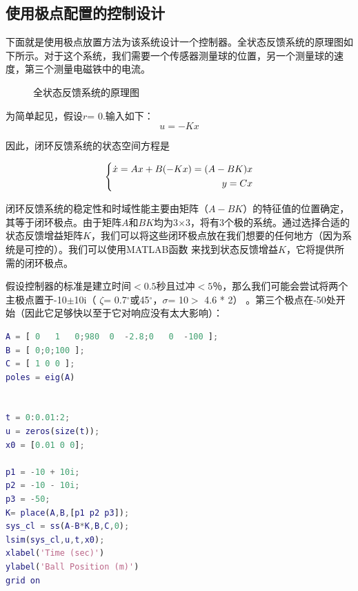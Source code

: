\documentclass[UTF8]{ctexart}
\begin{document}
\subsection{ 使用极点配置的控制设计}
\par   下面就是使用极点放置方法为该系统设计一个控制器。全状态反馈系统的原理图如下所示。对于这个系统，我们需要一个传感器测量球的位置，另一个测量球的速度，第三个测量电磁铁中的电流。
\newpage
\par \begin{figure}[ht]   
  \caption{\label{1} 全状态反馈系统的原理图}      
 \end{figure}
\par    为简单起见，假设$ r $= 0.输入如下：
\begin{equation}
u=-Kx
\end{equation}
\par 因此，闭环反馈系统的状态空间方程是
\par \begin{equation}
   \left  \{\begin{aligned}
      \dot x=Ax+B(-Kx)=(A-BK)x    \\
      y=Cx    \\
        \end{aligned}\\
    \right.
 \end{equation}
\par  闭环反馈系统的稳定性和时域性能主要由矩阵（$ A-BK $）的特征值的位置确定，其等于闭环极点。由于矩阵$ A $和$ BK $均为3×3，将有3个极的系统。通过选择合适的状态反馈增益矩阵$ K $，我们可以将这些闭环极点放在我们想要的任何地方（因为系统是可控的）。我们可以使用MATLAB函数 来找到状态反馈增益$ K $，它将提供所需的闭环极点。
\par  假设控制器的标准是建立时间$<0.5$秒且过冲$<5％$，那么我们可能会尝试将两个主极点置于-10$\pm$10i（ $\zeta$= 0.7$^{\circ}$或45$^{\circ}$，$ \sigma$= 10$>$ 4.6 * 2） 。第三个极点在-50处开始（因此它足够快以至于它对响应没有太大影响）：
\par  \begin{lstlisting}[language=matlab,escapeinside=``]
A = [ 0   1   0;980  0  -2.8;0   0  -100 ];
B = [ 0;0;100 ];
C = [ 1 0 0 ];
poles = eig(A)


t = 0:0.01:2;
u = zeros(size(t));
x0 = [0.01 0 0];

p1 = -10 + 10i;
p2 = -10 - 10i;
p3 = -50;
K= place(A,B,[p1 p2 p3]);
sys_cl = ss(A-B*K,B,C,0);
lsim(sys_cl,u,t,x0);
xlabel('Time (sec)')
ylabel('Ball Position (m)')
grid on
\end{lstlisting}
\end{document}
